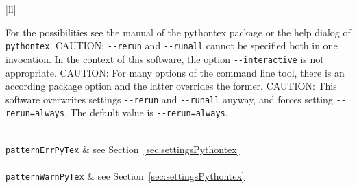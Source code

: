 \begin{longtable}{|ll|}
{\begin{minipage}{0.95\linewidth}
For the possibilities see the manual of the pythontex package 
or the help dialog of \texttt{pythontex}. 
CAUTION\@: \texttt{-{}-rerun} and \texttt{-{}-runall} cannot be specified both in one invocation. 
In the context of this software, the option
\texttt{-{}-interactive} is not appropriate. 
CAUTION\@: For many options of the command line tool, 
there is an according package option and the latter overrides the former. 
CAUTION\@: This software overwrites settings \texttt{-{}-rerun} and \texttt{-{}-runall} anyway, 
and forces setting \texttt{-{}-rerun=always}. 
The default value is \texttt{-{}-rerun=always}. 
\end{minipage}
} \\
\texttt{patternErrPyTex}    & see Section~\ref{sec:settingsPythontex} \\
 \\
\texttt{patternWarnPyTex}    & see Section~\ref{sec:settingsPythontex} \\
 \\
\end{longtable}

